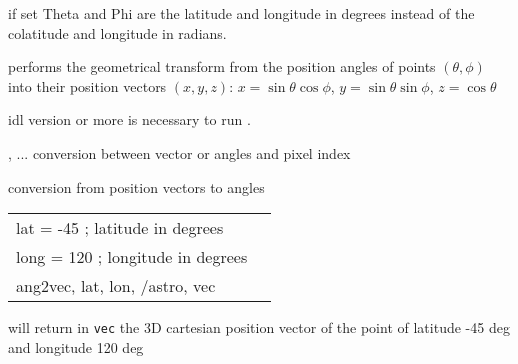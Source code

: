 \begin{keywords}
  \begin{kwlist}{} %
    \item[ASTRO\mytarget{idl:ang2vec:ASTRO}%
 =] if set Theta and Phi are the latitude and longitude in
    degrees instead of the colatitude and longitude in radians.
  \end{kwlist}
\end{keywords}  

\begin{codedescription}
{\facname{} performs the geometrical transform from the position angles of points 
$(\theta,\phi)$
into their position vectors $(x,y,z)$:
$x = \sin\theta\cos\phi$, $y=\sin\theta\sin\phi$, $z=\cos\theta$}
\end{codedescription}



\begin{related}
  \begin{sulist}{} %
    \item[idl] version \idlversion or more is necessary to run \facname.	
    \item[\htmlref{pix2xxx}{idl:pix_tools}, ... ] conversion between vector or angles and pixel index
    \item[\htmlref{vec2ang}{idl:vec2ang}] conversion from position vectors to angles
  \end{sulist}
\end{related}

\begin{example}
{
\begin{tabular}{ll} %
lat = -45 ; latitude in degrees \\
long = 120 ; longitude in degrees \\
ang2vec, lat, lon, /astro, vec
\end{tabular}
}
{will return in {\tt vec} the 3D cartesian position vector of the point of latitude -45 deg and longitude 120 deg
}
\end{example}


